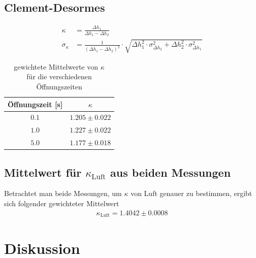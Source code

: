 \documentclass[12pt,a4paper,titlepage,headinclude,bibtotoc]{scrartcl}
\begin{document}
\subsection{Clement-Desormes}

\begin{align}
	\kappa&=\frac{\Delta h_{1}}{\Delta h_{1} - \Delta h_{2}}\\
	\sigma_{\kappa}&=\frac{1}{\left(\Delta h_{1} - \Delta h_{2}\right)^{2}} \cdot \sqrt{\Delta h_{1}^{2} \cdot \sigma_{\Delta h_2}^{2} + \Delta h_{2}^{2} \cdot \sigma_{\Delta h_1}^{2}}
\end{align}

\begin{table}[!htb]
	\centering
	\begin{tabular}{|c|c|}
		\hline
		Öffnungszeit [s] & $\kappa$\\
		\hline
		$ 0.1 $ & $ 1.205 \pm 0.022 $ \\
		$ 1.0 $ & $ 1.227 \pm 0.022 $ \\
		$ 5.0 $ & $ 1.177 \pm 0.018 $ \\
		\hline
	\end{tabular}
	\caption{gewichtete Mittelwerte von $\kappa$ \\ für die verschiedenen Öffnungszeiten}
	\label{tab:CDKappa}
\end{table}

\subsection{Mittelwert für $\kappa_\text{Luft}$ aus beiden Messungen}
Betrachtet man beide Messungen, um $\kappa$ von Luft genauer zu bestimmen, ergibt sich folgender gewichteter Mittelwert
\begin{align}
	\kappa_\text{Luft}=1.4042 \pm 0.0008
\end{align}

\section{Diskussion}
\label{sec:diskussion}
\end{document}
